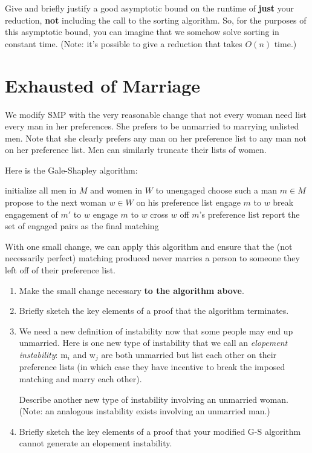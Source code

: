 \documentclass[11pt, oneside]{article}   	%
\theoremstyle{definition}
\theoremstyle{remark}
\begin{document}
Give and briefly justify a good asymptotic bound on the runtime
of \textbf{just} your reduction, \textbf{not} including the call to the sorting
algorithm. So, for the purposes of this asymptotic bound, you can
imagine that we somehow solve sorting in constant time. (Note: it's
possible to give a reduction that takes $O(n)$ time.)




\section{Exhausted of Marriage}

We modify SMP with the very reasonable change that not every woman
need list every man in her preferences. She prefers to be unmarried to
marrying unlisted men. Note that she clearly prefers any man on her
preference list to any man not on her preference list. Men can
similarly truncate their lists of women.

Here is the Gale-Shapley algorithm:
  \begin{algorithmic}[1]
    \State initialize all men in $M$ and women in $W$ to unengaged
      \State choose such a man $m \in M$
      \State propose to the next woman $w \in W$ on his preference list
        \State engage $m$ to $w$
        \State break engagement of $m'$ to $w$
        \State engage $m$ to $w$
      \EndIf
      \State cross $w$ off $m$'s preference list
    \EndWhile
    \State report the set of engaged pairs as the final matching
  \EndProcedure
  \end{algorithmic}
With one small change, we can apply this algorithm and ensure that the
(not necessarily perfect) matching produced never marries a person to
someone they left off of their preference list.
\begin{enumerate}
\item Make the small change necessary \textbf{to the algorithm above}.
\item Briefly sketch the key elements of a proof that the algorithm
   terminates.
\item We need a new definition of instability now that some people may
   end up unmarried. Here is one new type of instability that we call
   an \emph{elopement instability}: m$_i$ and w$_j$ are both unmarried but list
   each other on their preference lists (in which case they have
   incentive to break the imposed matching and marry each other).
   
   Describe another new type of instability involving an unmarried
   woman. (Note: an analogous instability exists involving an
   unmarried man.)
\item Briefly sketch the key elements of a proof that your modified G-S
   algorithm cannot generate an elopement instability.
\end{enumerate}
\end{document}
